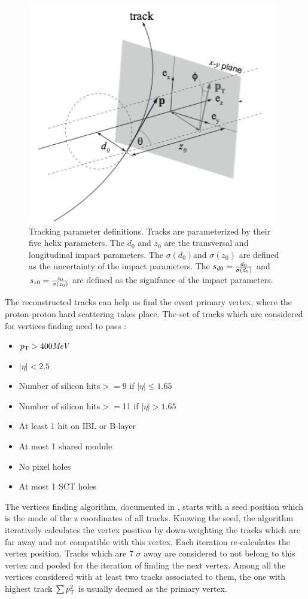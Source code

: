 \begin{figure}[htpb!]
\begin{center}
  \includegraphics[width=0.55\linewidth]{figures/Reco/trackpar.png}
\caption{Tracking parameter definitions. Tracks are parameterized by their five helix parameters. The $d_0$ and $z_0$ are the transversal and longitudinal impact parameters. The $\sigma(d_0)$and $\sigma(z_0)$ are defined as the uncertainty of the impact parameters. The $s_{d0}=\frac{d_0}{\sigma(d_0)}$ and $s_{z0}=\frac{z_0}{\sigma(z_0)}$ are defined as the signifance of the impact parameters.}
\label{fig:reco-trkdef}
\end{center}
\end{figure}


The reconstructed tracks can help us find the event primary vertex, where the proton-proton hard scattering takes place. The set of tracks which are considered for vertices finding need to pass \cite{ATL-PHYS-PUB-2015-026}:

\begin{itemize}
\item $p_{{\rm T}} > 400 \textit{MeV}$
\item $|\eta|<2.5$
\item Number of silicon hits$>=$9 if $|\eta|\leq 1.65$
\item Number of silicon hits$>=$11 if $|\eta|>1.65$
\item At least 1 hit on IBL or B-layer
\item At most 1 shared module
\item No pixel holes
\item At most 1 SCT holes
\end{itemize}

The vertices finding algorithm, documented in \cite{PERF-2015-01}, starts with a seed position which is the mode of the z coordinates of all tracks. Knowing the seed, the algorithm iteratively calculates the vertex position by down-weighting the tracks which are far away and not compatible with this vertex. Each iteration re-calculates the vertex position. Tracks which are 7 $\sigma$ away are considered to not belong to this vertex and pooled for the iteration of finding the next vertex. Among all the vertices considered with at least two tracks associated to them, the one with highest track $\sum p_{{\rm T}}^2$ is usually deemed as the primary vertex.

